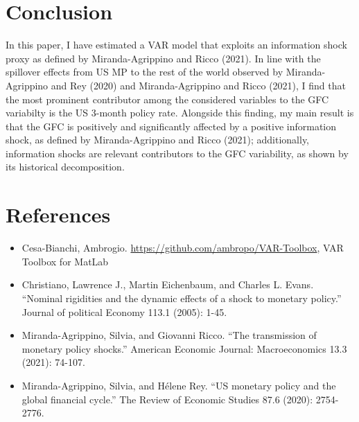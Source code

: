\documentclass[11pt,a4paper]{article}
\begin{document}
\section{Conclusion}
In this paper, I have estimated a VAR model that exploits an information shock proxy as defined by Miranda-Agrippino and Ricco (2021).
In line with the spillover effects from US MP to the rest of the world observed by Miranda-Agrippino and Rey (2020) and Miranda-Agrippino and Ricco (2021), I find that the most prominent contributor among the considered variables to the GFC variabilty is the US 3-month policy rate. Alongside this finding, my main result is that the GFC is positively and significantly affected by a positive information shock, as defined by Miranda-Agrippino and Ricco (2021); additionally, information shocks are relevant contributors to the GFC variability, as shown by its historical decomposition. 




\section*{References}
\begin{itemize}
    \item Cesa-Bianchi, Ambrogio. \url{https://github.com/ambropo/VAR-Toolbox}, VAR Toolbox for MatLab
    \item Christiano, Lawrence J., Martin Eichenbaum, and Charles L. Evans. \enquote{Nominal rigidities and the dynamic effects of a shock to monetary policy.} Journal of political Economy 113.1 (2005): 1-45.
    \item Miranda-Agrippino, Silvia, and Giovanni Ricco. \enquote{The transmission of monetary policy shocks.} American Economic Journal: Macroeconomics 13.3 (2021): 74-107.
    \item Miranda-Agrippino, Silvia, and Hélene Rey. \enquote{US monetary policy and the global financial cycle.} The Review of Economic Studies 87.6 (2020): 2754-2776.
    
\end{itemize}
\end{document}

